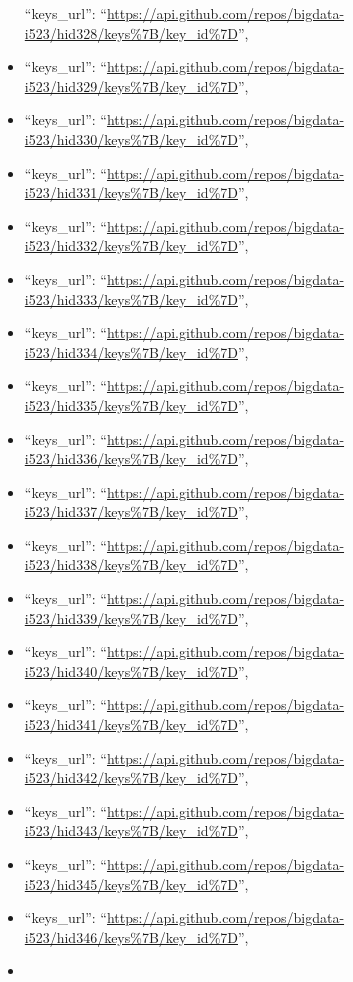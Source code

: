 \begin{itemize}
  ``keys\_url'':
  ``\url{https://api.github.com/repos/bigdata-i523/hid328/keys\%7B/key_id\%7D}'',
\item
  ``keys\_url'':
  ``\url{https://api.github.com/repos/bigdata-i523/hid329/keys\%7B/key_id\%7D}'',
\item
  ``keys\_url'':
  ``\url{https://api.github.com/repos/bigdata-i523/hid330/keys\%7B/key_id\%7D}'',
\item
  ``keys\_url'':
  ``\url{https://api.github.com/repos/bigdata-i523/hid331/keys\%7B/key_id\%7D}'',
\item
  ``keys\_url'':
  ``\url{https://api.github.com/repos/bigdata-i523/hid332/keys\%7B/key_id\%7D}'',
\item
  ``keys\_url'':
  ``\url{https://api.github.com/repos/bigdata-i523/hid333/keys\%7B/key_id\%7D}'',
\item
  ``keys\_url'':
  ``\url{https://api.github.com/repos/bigdata-i523/hid334/keys\%7B/key_id\%7D}'',
\item
  ``keys\_url'':
  ``\url{https://api.github.com/repos/bigdata-i523/hid335/keys\%7B/key_id\%7D}'',
\item
  ``keys\_url'':
  ``\url{https://api.github.com/repos/bigdata-i523/hid336/keys\%7B/key_id\%7D}'',
\item
  ``keys\_url'':
  ``\url{https://api.github.com/repos/bigdata-i523/hid337/keys\%7B/key_id\%7D}'',
\item
  ``keys\_url'':
  ``\url{https://api.github.com/repos/bigdata-i523/hid338/keys\%7B/key_id\%7D}'',
\item
  ``keys\_url'':
  ``\url{https://api.github.com/repos/bigdata-i523/hid339/keys\%7B/key_id\%7D}'',
\item
  ``keys\_url'':
  ``\url{https://api.github.com/repos/bigdata-i523/hid340/keys\%7B/key_id\%7D}'',
\item
  ``keys\_url'':
  ``\url{https://api.github.com/repos/bigdata-i523/hid341/keys\%7B/key_id\%7D}'',
\item
  ``keys\_url'':
  ``\url{https://api.github.com/repos/bigdata-i523/hid342/keys\%7B/key_id\%7D}'',
\item
  ``keys\_url'':
  ``\url{https://api.github.com/repos/bigdata-i523/hid343/keys\%7B/key_id\%7D}'',
\item
  ``keys\_url'':
  ``\url{https://api.github.com/repos/bigdata-i523/hid345/keys\%7B/key_id\%7D}'',
\item
  ``keys\_url'':
  ``\url{https://api.github.com/repos/bigdata-i523/hid346/keys\%7B/key_id\%7D}'',
\item

\end{itemize}
